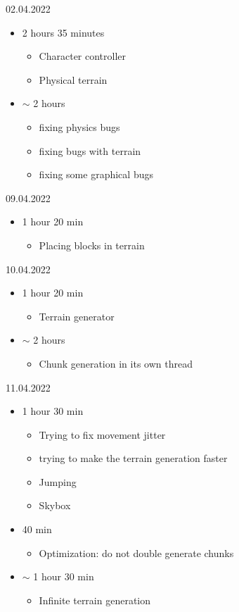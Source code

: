 \documentclass{article}
\begin{document}
02.04.2022
\begin{itemize}
	\item 2 hours 35 minutes
	\begin{itemize}
		\item Character controller
		\item Physical terrain
	\end{itemize}
\item $\sim$ 2 hours
\begin{itemize}
	\item fixing physics bugs
	\item fixing bugs with terrain
	\item fixing some graphical bugs
\end{itemize}
\end{itemize}

09.04.2022
\begin{itemize}
	\item 1 hour 20 min
	\begin{itemize}
		\item Placing blocks in terrain
	\end{itemize}
\end{itemize}

10.04.2022
\begin{itemize}
	\item 1 hour 20 min
	\begin{itemize}
		\item Terrain generator
	\end{itemize}
\item $\sim$ 2 hours
\begin{itemize}
	\item Chunk generation in its own thread
\end{itemize}
\end{itemize}

11.04.2022
\begin{itemize}
	\item 1 hour 30 min
	\begin{itemize}
		\item Trying to fix movement jitter
		\item trying to make the terrain generation faster
		\item Jumping
		\item Skybox
	\end{itemize}
\item 40 min
\begin{itemize}
	\item Optimization: do not double generate chunks
\end{itemize}
\item $\sim$ 1 hour 30 min
\begin{itemize}
	\item Infinite terrain generation
\end{itemize}
\end{itemize}
\end{document}
